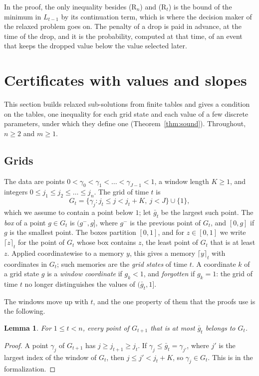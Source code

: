 \documentclass[11pt]{amsart}
\newtheorem{lemma}[theorem]{Lemma}
\theoremstyle{definition}
\numberwithin{equation}{section}
\newcommand{\lean}[1]{\ignorespaces}
\newcommand{\ceil}[2]{\lceil #1\rceil_{#2}}
\begin{document}
In the proof, the only inequality besides (R$_n$) and (R$_t$) is the bound of the minimum in $L_{t-1}$ by its continuation term, which is where the decision maker of the relaxed problem goes on. The penalty of a drop is paid in advance, at the time of the drop, and it is the probability, computed at that time, of an event that keeps the dropped value below the value selected later.

\section{Certificates with values and slopes}\label{sec:cert}

This section builds relaxed sub-solutions from finite tables and gives a condition on the tables, one inequality for each grid state and each value of a few discrete parameters, under which they define one (Theorem~\ref{thm:sound}). Throughout, $n\ge2$ and $m\ge1$.

\subsection{Grids}\label{sec:grids}
The data are points $0<\gamma_0<\gamma_1<\dots<\gamma_{J-1}<1$, a window length $K\ge1$, and integers $0\le j_1\le j_2\le\dots\le j_n$. The grid of time $t$ is
\[
G_t=\{\gamma_j: j_t\le j<j_t+K,\ j<J\}\cup\{1\},
\]
which we assume to contain a point below $1$; let $\bar g_t$ be the largest such point. The \emph{box} of a point $g\in G_t$ is $(g^-,g]$, where $g^-$ is the previous point of $G_t$, and $[0,g]$ if $g$ is the smallest point. The boxes partition $[0,1]$, and for $z\in[0,1]$ we write $\ceil{z}{t}$ for the point of $G_t$ whose box contains $z$, the least point of $G_t$ that is at least $z$. Applied coordinatewise to a memory $y$, this gives a memory $\ceil{y}{t}$ with coordinates in $G_t$; such memories are the \emph{grid states} of time $t$. A coordinate $k$ of a grid state $g$ is a \emph{window coordinate} if $g_k<1$, and \emph{forgotten} if $g_k=1$: the grid of time $t$ no longer distinguishes the values of $(\bar g_t,1]$.

The windows move up with $t$, and the one property of them that the proofs use is the following.

\begin{lemma}\label{lem:W}\lean{Robbins.Cert.Grid.so_propW}
For $1\le t<n$, every point of $G_{t+1}$ that is at most $\bar g_t$ belongs to $G_t$.
\end{lemma}

\begin{proof}
A point $\gamma_j$ of $G_{t+1}$ has $j\ge j_{t+1}\ge j_t$. If $\gamma_j\le\bar g_t=\gamma_{j'}$, where $j'$ is the largest index of the window of $G_t$, then $j\le j'<j_t+K$, so $\gamma_j\in G_t$. This is  in the formalization.
\end{proof}
\end{document}
